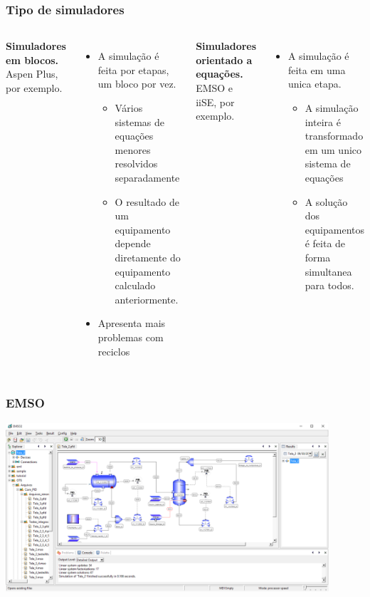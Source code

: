\documentclass[aspectratio=169]{beamer}
\begin{document}
\begin{frame}
	\frametitle{Tipo de simuladores}
	\begin{columns}[t] 
			\textbf{Simuladores em blocos.}\\
			Aspen Plus, por exemplo.\\
			\begin{itemize}
				\item A simulação é feita por etapas, um bloco por vez.
				\begin{itemize}
					\item Vários sistemas de equações menores resolvidos separadamente
					\item O resultado de um equipamento depende diretamente do 
				equipamento calculado anteriormente.
				\end{itemize}
				\item Apresenta mais problemas com reciclos
			\end{itemize}
			\textbf{Simuladores orientado a equações.}\\
			EMSO e iiSE, por exemplo.\\
			\begin{itemize}
				\item A simulação é feita em uma unica etapa.
				\begin{itemize}
					\item A simulação inteira é transformado em um unico sistema de equações
					\item A solução dos equipamentos é feita de forma simultanea para
					todos.
				\end{itemize}
				
			\end{itemize}
	\end{columns}
\end{frame}

\begin{frame}
	\frametitle{EMSO}
	\begin{center}
		\includegraphics[width=0.9\textwidth]{img/EMSO_1.PNG}
	\end{center}
\end{frame}
\end{document}
